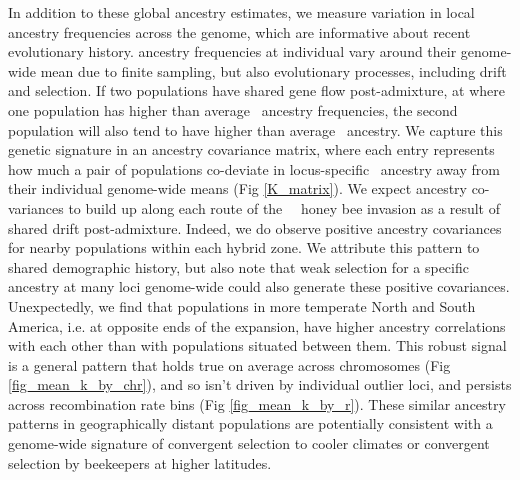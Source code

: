 In addition to these global ancestry estimates, we measure variation in local ancestry frequencies across the genome, which are informative about recent evolutionary history.  ancestry frequencies at individual   vary around their genome-wide mean due to finite sampling, but also evolutionary processes, including drift and selection. If two populations have shared gene flow post-admixture, at  where one population has higher than average \scutellata\ ancestry frequencies, the second population will also tend to have higher than average \scutellata\ ancestry. We capture this genetic signature in an ancestry covariance matrix, where each entry represents how much a pair of populations co-deviate in locus-specific \scutellata\ ancestry away from their individual genome-wide means (Fig \ref{K_matrix}). We expect ancestry co-variances to build up along each route of the \africanized\ \hyb\ honey bee invasion as a result of shared drift post-admixture. Indeed, we do observe positive ancestry covariances for nearby populations within each hybrid zone. We attribute this pattern to shared demographic history, but also note that weak selection for a specific ancestry at many loci genome-wide could also generate these positive covariances. Unexpectedly, we find that populations in more temperate North and South America, i.e. at opposite ends of the expansion, have higher ancestry correlations with each other than with populations situated between them. This robust signal is a general pattern that holds true on average across chromosomes (Fig \ref{fig_mean_k_by_chr}), and so isn't driven by individual outlier loci, and persists across recombination rate bins (Fig \ref{fig_mean_k_by_r}). These similar ancestry patterns in geographically distant populations are potentially consistent with a genome-wide signature of convergent selection to cooler climates or convergent selection by beekeepers at higher latitudes. 

